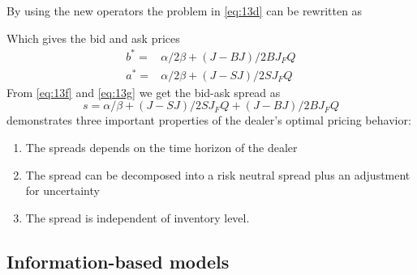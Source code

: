 \documentclass{kththesis}
\theoremstyle{definition}
\begin{document}
By using the new operators the problem in \autoref{eq:13d} can be rewritten as

Which gives the bid and ask prices
\begin{align}
\label{eq:13f}
    b^{*} = & \alpha/2\beta + (J-BJ)/2BJ_{F}Q \\
    a^{*} = & \alpha/2\beta + (J-SJ)/2SJ_{F}Q \label{eq:13g}
\end{align}
From \autoref{eq:13f} and \autoref{eq:13g} we get the bid-ask spread as
\begin{equation}
    \label{eq:13h}
    s = \alpha / \beta + (J-SJ)/2SJ_{F}Q + (J-BJ)/2BJ_{F}Q
\end{equation}
\textcite{ho1981optimal} demonstrates three important properties of the dealer's optimal pricing behavior:

\begin{enumerate}
    \item The spreads depends on the time horizon of the dealer
    \item The spread can be decomposed into a risk neutral spread plus an adjustment for uncertainty
    \item The spread is independent of inventory level.
\end{enumerate}

\subsection{Information-based models}
\end{document}
